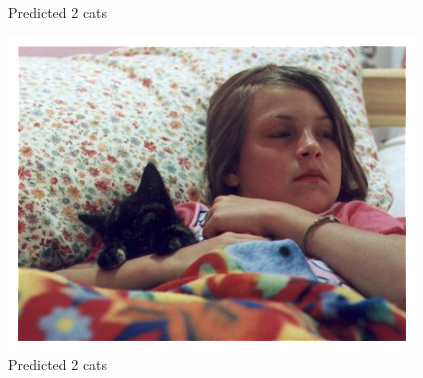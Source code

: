 \documentclass{article}
\begin{document}
\begin{figure}[h!]
\begin{minipage}[b]{0.3\textwidth}
        \caption{Predicted 2 cats}
        \label{fig:2cats}
    \end{minipage}
    \hfill
    \begin{minipage}[b]{0.3\textwidth}
        \centering
        \includegraphics[width=\textwidth]{figs/3.4_ex3.png}
        \caption{Predicted 2 cats}
        \label{fig:1cat1human}
    \end{minipage}
\end{figure}
\end{document}
